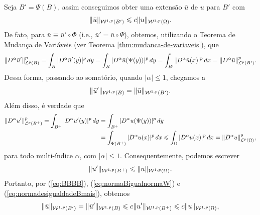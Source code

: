 \begin{prf}
    Seja $B' = \Psi(B)$, assim conseguimos obter uma extensão $\bar u$ de $u$ para $B'$ com
    \[
        \Vert \bar u \Vert_{\mathcal{W}^{1,p}(B')} \leqslant c \Vert u \Vert_{\mathcal{W}^{1,p}(\Omega)}.
    \]
    De fato, para $\bar u \equiv \bar u' \circ \Phi$ (i.e., $\bar u' = \bar u \circ \Psi$), obtemos, utilizando o Teorema de Mudança de Variáveis (ver Teorema \ref{thm:mudanca-de-variaveis}), que
    \[
        \Vert D^\alpha \bar u' \Vert_{\mathcal{L}^p(B)}^p = \int_B |D^\alpha \bar u'(y)|^p \,dy = \int_B |D^\alpha \bar u (\Psi (y))|^p \,dy = \int_{B'} |D^\alpha \bar u (x)|^p \,dx = \Vert D^\alpha \bar u \Vert_{\mathcal{L}^p(B')}^p.
    \]
    Dessa forma, passando ao somatório, quando $|\alpha| \leqslant 1$, chegamos a
    \begin{equation} \label{eq:normaBigualnormaW}
        \Vert \bar u' \Vert_{\mathcal{W}^{1,p}(B)} = \Vert  \bar u \Vert_{\mathcal{W}^{1,p}(B')}.
    \end{equation}
    Além disso, é verdade que
    \[
        \begin{aligned}
            \Vert D^\alpha u' \Vert_{\mathcal{L}^p(B^+)}^p = \int_{B^+} |D^\alpha u'(y) |^p \,dy &= \int_{B^+} |D^\alpha u (\Psi(y))|^p \,dy\\ &= \int_{\Psi(B^+)} |D^\alpha u(x)|^p \,dx \leqslant \int_{\Omega} |D^\alpha u(x)|^p \,dx = \Vert D^\alpha u \Vert_{\mathcal{L}^p(\Omega)}^p,
        \end{aligned}
    \]
    para todo multi-índice $\alpha$, com $|\alpha| \leqslant 1$.
    Consequentemente, podemos escrever
    \begin{equation} \label{eq:normadesigualdadeBmais}
        \Vert u' \Vert_{\mathcal{W}^{1,p}(B^+)} \leqslant \Vert u \Vert_{\mathcal{W}^{1,p}(\Omega)}.
    \end{equation}
    Portanto, por (\ref{eq:BBBB}), (\ref{eq:normaBigualnormaW}) e (\ref{eq:normadesigualdadeBmais}), obtemos
    \begin{equation} \label{eq:desigualdadeWO}
        \Vert \bar u \Vert_{\mathcal{W}^{1,p}(B')} = \Vert \bar u' \Vert_{\mathcal{W}^{1,p}(B)} \leqslant c \Vert u' \Vert_{\mathcal{W}^{1,p}(B^+)} \leqslant c \Vert u \Vert_{\mathcal{W}^{1,p}(\Omega)},
    \end{equation}


\end{prf}
